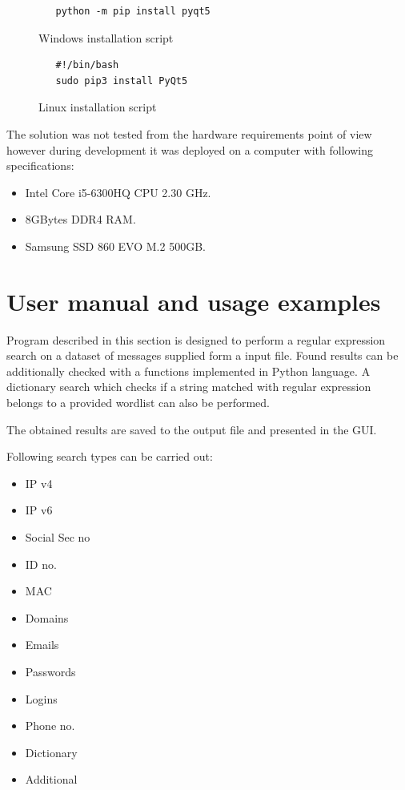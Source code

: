 \documentclass[a4paper,twoside,12pt]{book}
\begin{document}
\begin{figure}
   \centering
   \begin{lstlisting}
   python -m pip install pyqt5
   \end{lstlisting}
   \caption{Windows installation script}
   \label{fig:windowsScript}
\end{figure}

\begin{figure}
   \centering
   \begin{lstlisting}
   #!/bin/bash
   sudo pip3 install PyQt5
   \end{lstlisting}
   \caption{Linux installation script}
   \label{fig:linuxScript}
\end{figure}

The solution was not tested from the hardware requirements point of view however 
during development it was deployed on a computer with following specifications:

\begin{itemize}
   \item Intel Core i5-6300HQ CPU 2.30 GHz.
   \item 8GBytes DDR4 RAM.
   \item Samsung SSD 860 EVO M.2 500GB.
\end{itemize}

\section{User manual and usage examples}

Program described in this section is designed to perform a regular expression search on a dataset of messages supplied form a input file. Found results can 
be additionally checked with a functions implemented in Python language. A dictionary search which checks if a string matched with regular expression belongs to a provided wordlist
can also be performed.

The obtained results are saved to the output file and presented in the GUI.

Following search types can be carried out:

\begin{itemize}
   \item IP v4
   \item IP v6
   \item Social Sec no
   \item ID no.
   \item MAC
   \item Domains
   \item Emails
   \item Passwords
   \item Logins
   \item Phone no.
   \item Dictionary
   \item Additional
\end{itemize}
\end{document}
